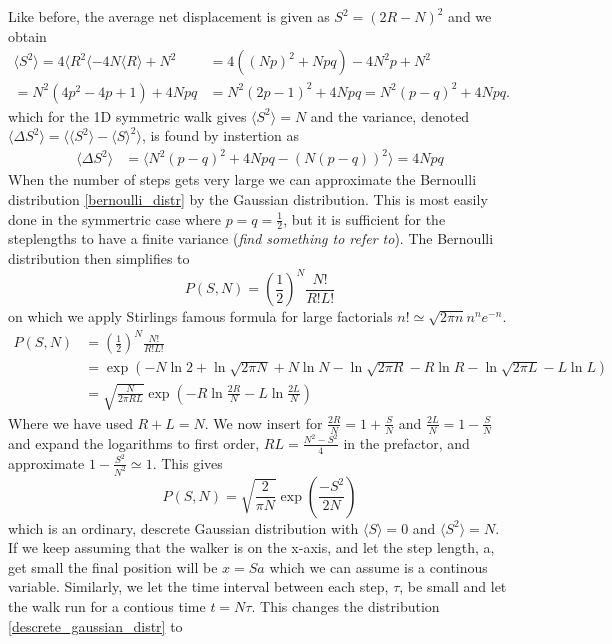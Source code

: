 Like before, the average net displacement is given as $S^2 = (2R-N)^2$ and we obtain
\begin{align*}
 \langle S^2\rangle = 4\langle R^2\langle -4N\langle R\rangle + N^2 &= 4((Np)^2 +Npq) -4N^2p + N^2\\
 = N^2(4p^2 -4p +1) +4Npq &= N^2(2p-1)^2 +4Npq = N^2(p-q)^2 +4Npq.
\end{align*}
which for the 1D symmetric walk gives $\langle S^2\rangle =N$ and the variance, denoted $\langle\Delta S^2\rangle = \langle\langle S^2\rangle-\langle S\rangle^2\rangle$, is found by instertion as
\begin{align}
 \langle\Delta S^2\rangle &= \langle N^2(p-q)^2 +4Npq - ( N(p-q))^2\rangle= 4Npq 
\end{align}
When the number of steps gets very large we can approximate the Bernoulli distribution \ref{bernoulli_distr} by the Gaussian distribution. 
This is most easily done in the symmertric case where $p=q=\frac{1}{2}$, but it is sufficient for the steplengths to have a finite variance (\emph{find something to refer to}). 
The Bernoulli distribution then simplifies to
\begin{equation}
 P(S,N) = \left(\frac{1}{2}\right)^N\frac{N!}{R!L!}
\end{equation}
on which we apply Stirlings famous formula for large factorials $n!\simeq\sqrt{2\pi n}n^ne^{-n}$.
\begin{align*}
 P(S,N) &= \left(\frac{1}{2}\right)^N\frac{N!}{R!L!} \\
 &= \exp\left(-N\ln2+\ln\sqrt{2\pi N}+N\ln N - \ln\sqrt{2\pi R} -R\ln R - \ln\sqrt{2\pi L} - L\ln L \right) \\
 &= \sqrt{\frac{N}{2\pi RL}}\exp\left(-R\ln\frac{2R}{N}-L\ln\frac{2L}{N}\right)
\end{align*}
Where we have used $R+L=N$. We now insert for $\frac{2R}{N}=1+\frac{S}{N}$ and $\frac{2L}{N}=1-\frac{S}{N}$ and expand the logarithms to first order, $RL=\frac{N^2-S^2}{4}$ in the prefactor, and approximate $1-\frac{S^2}{N^2}\simeq1$. This gives
\begin{equation}\label{descrete_gaussian_distr}
 P(S,N) =\sqrt{\frac{2}{\pi N}}\exp\left(\frac{-S^2}{2N}\right)
\end{equation}
which is an ordinary, descrete Gaussian distribution with $\langle S\rangle = 0$  and $\langle S^2\rangle = N$. 
If we keep assuming that the walker is on the x-axis, and let the step length, a, get small the final position will be $x=Sa$ which we can assume is a continous variable. 
Similarly, we let the time interval between each step, $\tau$, be small and let the walk run for a contious time $t=N\tau$. This changes the distribution \ref{descrete_gaussian_distr} to
